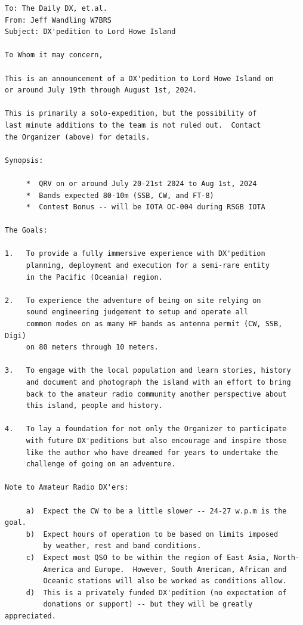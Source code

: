 \documentclass[11pt]{article}
\begin{document}
\begin{Verbatim}[fontsize=\small]
To: The Daily DX, et.al.
From: Jeff Wandling W7BRS
Subject: DX'pedition to Lord Howe Island

To Whom it may concern,

This is an announcement of a DX'pedition to Lord Howe Island on 
or around July 19th through August 1st, 2024.

This is primarily a solo-expedition, but the possibility of
last minute additions to the team is not ruled out.  Contact
the Organizer (above) for details.

Synopsis:

     *  QRV on or around July 20-21st 2024 to Aug 1st, 2024
     *  Bands expected 80-10m (SSB, CW, and FT-8)
     *  Contest Bonus -- will be IOTA OC-004 during RSGB IOTA

The Goals:

1.   To provide a fully immersive experience with DX'pedition
     planning, deployment and execution for a semi-rare entity
     in the Pacific (Oceania) region.

2.   To experience the adventure of being on site relying on
     sound engineering judgement to setup and operate all
     common modes on as many HF bands as antenna permit (CW, SSB, Digi)
     on 80 meters through 10 meters.

3.   To engage with the local population and learn stories, history
     and document and photograph the island with an effort to bring
     back to the amateur radio community another perspective about
     this island, people and history.

4.   To lay a foundation for not only the Organizer to participate
     with future DX'peditions but also encourage and inspire those
     like the author who have dreamed for years to undertake the
     challenge of going on an adventure.

Note to Amateur Radio DX'ers:

     a)  Expect the CW to be a little slower -- 24-27 w.p.m is the goal.
     b)  Expect hours of operation to be based on limits imposed
         by weather, rest and band conditions.
     c)  Expect most QSO to be within the region of East Asia, North-
         America and Europe.  However, South American, African and
         Oceanic stations will also be worked as conditions allow.
     d)  This is a privately funded DX'pedition (no expectation of
         donations or support) -- but they will be greatly appreciated.


\end{Verbatim}
\end{document}
